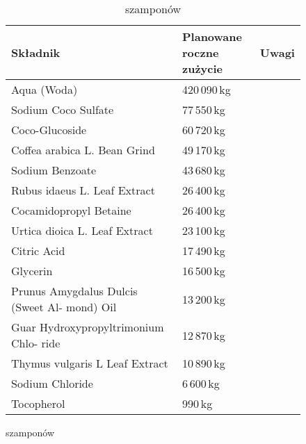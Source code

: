 \begin{table}[H]
\centering
\caption{Planowane roczne zużycie surowców do produkcji:}
\begin{footnotesize}
	\begin{subfigure}{0.7\textwidth}
		\centering
		\caption{szamponów}
		\begin{tabular}{p{}ll}
			\hline
			\textbf{Składnik} & \makecell[l]{\textbf{Planowane} \\ \textbf{roczne zużycie}} & \textbf{Uwagi} \\
			\hline\hline
			Aqua (Woda) & 420\,090\,kg & \\
			Sodium Coco Sulfate & 77\,550\,kg & \\
			Coco-Glucoside & 60\,720\,kg & \\
			Coffea arabica L. Bean Grind & 49\,170\,kg & \\
			Sodium Benzoate & 43\,680\,kg & \\
			Rubus idaeus L. Leaf Extract & 26\,400\,kg & \\
			Cocamidopropyl Betaine & 26\,400\,kg & \\
			Urtica dioica L. Leaf Extract & 23\,100\,kg & \\
			Citric Acid & 17\,490\,kg & \\
			Glycerin & 16\,500\,kg & \\
			Prunus Amygdalus Dulcis (Sweet Al- mond) Oil & 13\,200\,kg & \\
			Guar Hydroxypropyltrimonium Chlo- ride & 12\,870\,kg & \\
			Thymus vulgaris L Leaf Extract & 10\,890\,kg & \\
			Sodium Chloride & 6\,600\,kg & \\
			Tocopherol & 990\,kg & \\
			\hline
		\end{tabular}
	\end{subfigure}


\end{footnotesize}
\end{table}
